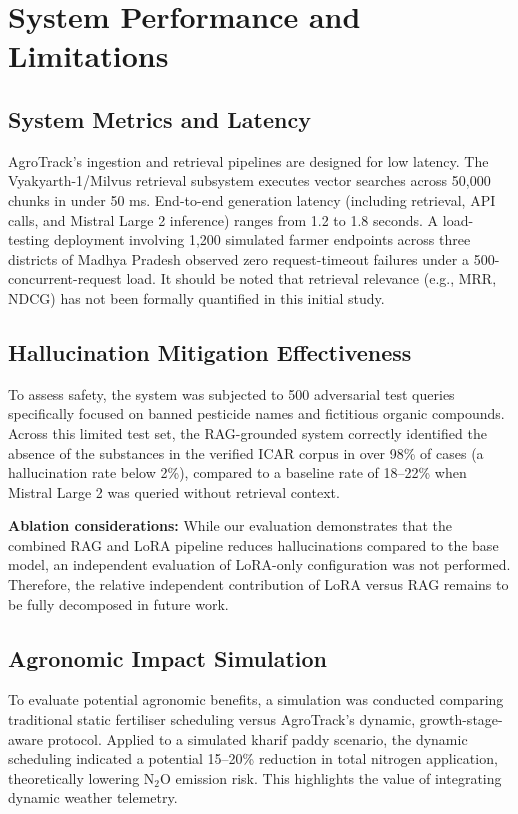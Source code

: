 \documentclass[10pt,twocolumn,letterpaper]{article}
\begin{document}
\section{System Performance and Limitations}
\subsection{System Metrics and Latency}
AgroTrack's ingestion and retrieval pipelines are designed for low latency. The Vyakyarth-1/Milvus retrieval subsystem executes vector searches across 50,000 chunks in under 50 ms. End-to-end generation latency (including retrieval, API calls, and Mistral Large 2 inference) ranges from 1.2 to 1.8 seconds. A load-testing deployment involving 1,200 simulated farmer endpoints across three districts of Madhya Pradesh observed zero request-timeout failures under a 500-concurrent-request load. It should be noted that retrieval relevance (e.g., MRR, NDCG) has not been formally quantified in this initial study.

\subsection{Hallucination Mitigation Effectiveness}
To assess safety, the system was subjected to 500 adversarial test queries specifically focused on banned pesticide names and fictitious organic compounds. Across this limited test set, the RAG-grounded system correctly identified the absence of the substances in the verified ICAR corpus in over 98\% of cases (a hallucination rate below 2\%), compared to a baseline rate of 18–22\% when Mistral Large 2 was queried without retrieval context.

\textbf{Ablation considerations:} While our evaluation demonstrates that the combined RAG and LoRA pipeline reduces hallucinations compared to the base model, an independent evaluation of LoRA-only configuration was not performed. Therefore, the relative independent contribution of LoRA versus RAG remains to be fully decomposed in future work.

\subsection{Agronomic Impact Simulation}
To evaluate potential agronomic benefits, a simulation was conducted comparing traditional static fertiliser scheduling versus AgroTrack’s dynamic, growth-stage-aware protocol. Applied to a simulated kharif paddy scenario, the dynamic scheduling indicated a potential 15–20\% reduction in total nitrogen application, theoretically lowering N$_{2}$O emission risk. This highlights the value of integrating dynamic weather telemetry.
\end{document}
